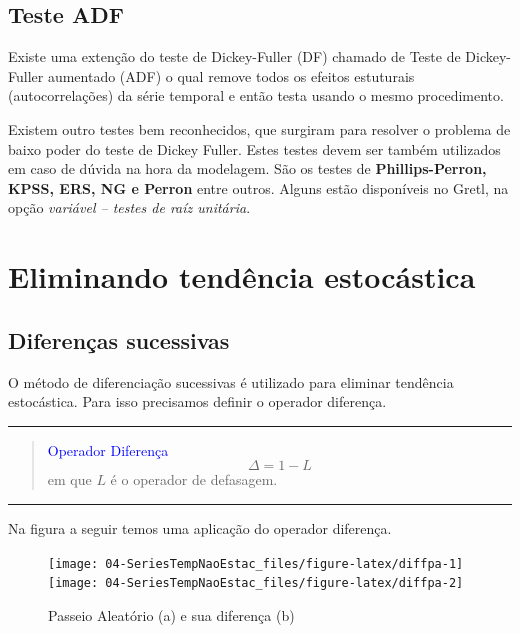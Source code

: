 \documentclass[
]{book}
\theoremstyle{definition}
\theoremstyle{definition}
\theoremstyle{definition}
\theoremstyle{remark}
\begin{document}
\hypertarget{teste-adf}{%
\subsection{Teste ADF}\label{teste-adf}}

Existe uma extenção do teste de Dickey-Fuller (DF) chamado de Teste de Dickey-Fuller aumentado (ADF) o qual remove todos os efeitos estuturais (autocorrelações) da série temporal e então testa usando o mesmo procedimento.

Existem outro testes bem reconhecidos, que surgiram para resolver o problema de baixo poder do teste de Dickey Fuller. Estes testes devem ser também utilizados em caso de dúvida na hora da modelagem. São os testes de \textbf{Phillips-Perron, KPSS, ERS, NG e Perron } entre outros. Alguns estão disponíveis no Gretl, na opção \emph{variável -- testes de raíz unitária}.

\hypertarget{eliminando-tenduxeancia-estocuxe1stica}{%
\section{Eliminando tendência estocástica}\label{eliminando-tenduxeancia-estocuxe1stica}}

\hypertarget{diferenuxe7as-sucessivas}{%
\subsection{Diferenças sucessivas}\label{diferenuxe7as-sucessivas}}

O método de diferenciação sucessivas é utilizado para eliminar tendência estocástica. Para isso precisamos definir o operador diferença.

\begin{center}\rule{0.5\linewidth}{0.5pt}\end{center}

\begin{quote}
\textcolor{blue}{Operador Diferença}
\begin{equation*}
\Delta =1-L
\end{equation*}
em que \(L\) é o operador de defasagem.
\end{quote}

\begin{center}\rule{0.5\linewidth}{0.5pt}\end{center}

Na figura a seguir temos uma aplicação do operador diferença.

\begin{figure}
\texttt{[image: 04-SeriesTempNaoEstac\_files/figure-latex/diffpa-1]} \texttt{[image: 04-SeriesTempNaoEstac\_files/figure-latex/diffpa-2]} \caption{Passeio Aleatório (a) e sua diferença (b)}\label{fig:diffpa}
\end{figure}
\end{document}
